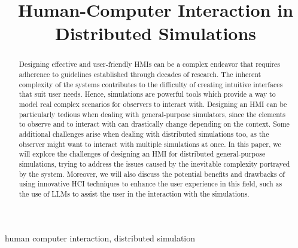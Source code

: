 \documentclass[conference]{IEEEtran}
\begin{document}
\title{Human-Computer Interaction in Distributed Simulations\\
}

\author{
}

\maketitle

\begin{abstract}
    Designing effective and user-friendly \acp{HMI} can be a complex endeavor that requires adherence to guidelines
    established through decades of research.
    The inherent complexity of the systems contributes to the difficulty of creating intuitive interfaces that suit user needs.
    Hence,
    simulations are powerful tools which provide a way to model real complex scenarios for observers to interact with.
    Designing an \ac{HMI} can be particularly tedious when dealing with general-purpose simulators,
    since the elements to observe and to interact with can drastically change depending on the context.
    Some additional challenges arise when dealing with distributed simulations too,
    as the observer might want to interact with multiple simulations at once.
    In this paper,
    we will explore the challenges of designing an \ac{HMI} for distributed general-purpose simulations,
    trying to address the issues caused by the inevitable complexity portrayed by the system.
    Moreover,
    we will also discuss the potential benefits and drawbacks of using innovative \ac{HCI} techniques to enhance the user experience in this field,
    such as the use of \acp{LLM} to assist the user in the interaction with the simulations.
\end{abstract}

\begin{IEEEkeywords}
    human computer interaction, distributed simulation
\end{IEEEkeywords}
\end{document}
